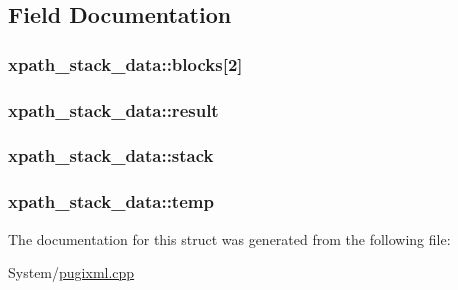\subsection{Field Documentation}
\hypertarget{structxpath__stack__data_a6821cc444dd65d997467fd3f757f4aff}{
\subsubsection[{blocks}]{ xpath\-\_\-stack\-\_\-data\-::blocks\mbox{[}2\mbox{]}}}\label{structxpath__stack__data_a6821cc444dd65d997467fd3f757f4aff}
\hypertarget{structxpath__stack__data_ab073a685c66383ded44076993afe62d6}{
\subsubsection[{result}]{ xpath\-\_\-stack\-\_\-data\-::result}}\label{structxpath__stack__data_ab073a685c66383ded44076993afe62d6}
\hypertarget{structxpath__stack__data_ad26a92328f9aaf83fa62cb6695dbee90}{
\subsubsection[{stack}]{ xpath\-\_\-stack\-\_\-data\-::stack}}\label{structxpath__stack__data_ad26a92328f9aaf83fa62cb6695dbee90}
\hypertarget{structxpath__stack__data_a56e6bb486d52f4c5c2d02370e1b41058}{
\subsubsection[{temp}]{ xpath\-\_\-stack\-\_\-data\-::temp}}\label{structxpath__stack__data_a56e6bb486d52f4c5c2d02370e1b41058}


The documentation for this struct was generated from the following file\-:\begin{DoxyCompactItemize}
\item 
System/\hyperlink{pugixml_8cpp}{pugixml.\-cpp}\end{DoxyCompactItemize}

